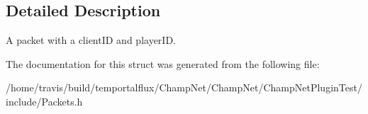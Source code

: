 \subsection{Detailed Description}
A packet with a client\-I\-D and player\-I\-D. 

The documentation for this struct was generated from the following file\-:\begin{DoxyCompactItemize}
\item 
/home/travis/build/temportalflux/\-Champ\-Net/\-Champ\-Net/\-Champ\-Net\-Plugin\-Test/include/Packets.\-h\end{DoxyCompactItemize}

